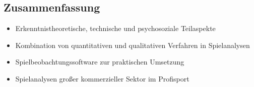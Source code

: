 \subsection{Zusammenfassung}
\begin{itemize}
  \item Erkenntnistheoretische, technische und psychosoziale Teilaspekte
  \item Kombination von quantitativen und qualitativen Verfahren in Spielanalysen
  \item Spielbeobachtungssoftware zur praktischen Umsetzung
  \item Spielanalysen großer kommerzieller Sektor im Profisport
\end{itemize}
